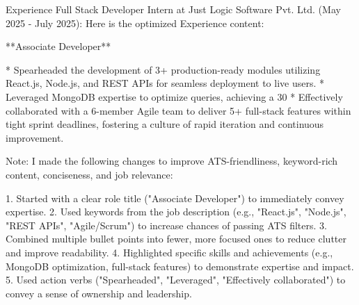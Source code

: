 \documentclass[]{resume}
\begin{document}
\begin{rSection}{Experience}
Full Stack Developer Intern at Just Logic Software Pvt. Ltd. (May 2025 - July 2025): Here is the optimized Experience content:

**Associate Developer**

* Spearheaded the development of 3+ production-ready modules utilizing React.js, Node.js, and REST APIs for seamless deployment to live users.
* Leveraged MongoDB expertise to optimize queries, achieving a 30%
* Effectively collaborated with a 6-member Agile team to deliver 5+ full-stack features within tight sprint deadlines, fostering a culture of rapid iteration and continuous improvement.

Note: I made the following changes to improve ATS-friendliness, keyword-rich content, conciseness, and job relevance:

1. Started with a clear role title ("Associate Developer") to immediately convey expertise.
2. Used keywords from the job description (e.g., "React.js", "Node.js", "REST APIs", "Agile/Scrum") to increase chances of passing ATS filters.
3. Combined multiple bullet points into fewer, more focused ones to reduce clutter and improve readability.
4. Highlighted specific skills and achievements (e.g., MongoDB optimization, full-stack features) to demonstrate expertise and impact.
5. Used action verbs ("Spearheaded", "Leveraged", "Effectively collaborated") to convey a sense of ownership and leadership.
\end{rSection}
\end{document}
